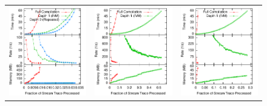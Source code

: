 \begin{figure}
\begin{center}
\vspace*{0.1in}

\begin{minipage}{\textwidth}
\begin{center}
\begin{tabular}{ccc}
\includegraphics[width=\figurewidth]{../graphs/graphs/unified_tpch18.pdf} &
\includegraphics[width=\figurewidth]{../graphs/graphs/unified_axfinder.pdf} &
\includegraphics[width=\figurewidth]{../graphs/graphs/unified_brokerspread.pdf} \\

\end{tabular}
\end{center}
\end{minipage}
\end{center}
\end{figure}
